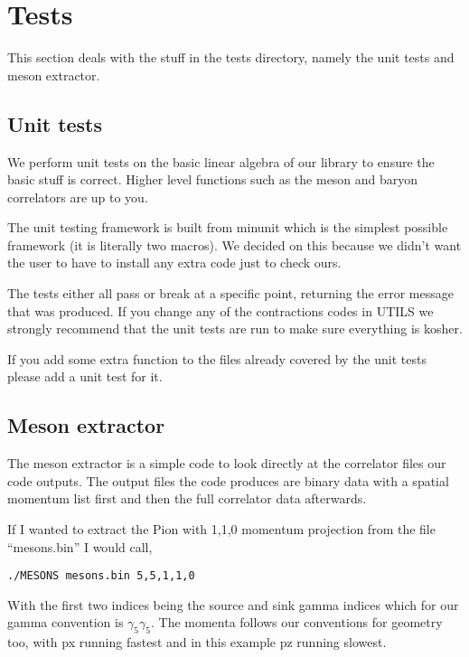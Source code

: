 \section{Tests}

This section deals with the stuff in the tests directory, namely
the unit tests and meson extractor.

\subsection{Unit tests}

We perform unit tests on the basic linear algebra of our library
to ensure the basic stuff is correct. Higher level functions
such as the meson and baryon correlators are up to you.

The unit testing framework is built from minunit %
which is the simplest possible framework (it is literally
two macros). We decided on this because we didn't want the user
to have to install any extra code just to check ours.

The tests either all pass or break at a specific point, returning 
the error message that was produced. If you change any of the
contractions codes in UTILS we strongly recommend that the
unit tests are run to make sure everything is kosher.

If you add some extra function to the files already covered by
the unit tests please add a unit test for it.

\subsection{Meson extractor}

The meson extractor is a simple code to look directly at the
correlator files our code outputs. The output files the code
produces are binary data with a spatial momentum list first and
then the full correlator data afterwards.

If I wanted to extract the Pion with 1,1,0 momentum projection
from the file ``mesons.bin'' I would call,
\begin{verbatim}
./MESONS mesons.bin 5,5,1,1,0
\end{verbatim}
With the first two indices being the source and sink gamma indices
which for our gamma convention is $\gamma_5 \gamma_5$. The momenta
follows our conventions for geometry too, with px running fastest
and in this example pz running slowest.
